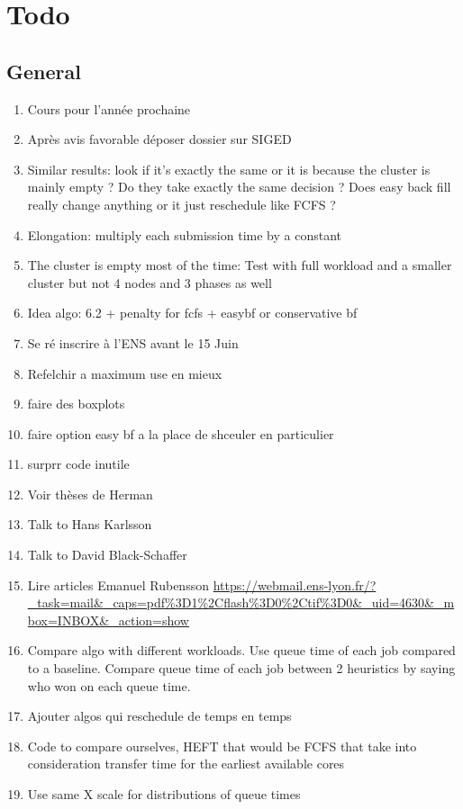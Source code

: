 \documentclass[a4paper]{article}
\begin{document}
\section{Todo}
	\subsection{General}
		\begin{enumerate}
			\item Cours pour l'année prochaine
			\item Après avis favorable déposer dossier sur SIGED
			\item Similar results: look if it's exactly the same or it is because the cluster is mainly empty ? Do they take exactly the same decision ? Does easy back fill really change anything or it just reschedule like FCFS ?
			\item Elongation: multiply each submission time by a constant
			\item The cluster is empty most of the time: Test with full workload and a smaller cluster but not 4 nodes and 3 phases as well
			\item Idea algo: 6.2 + penalty for fcfs + easybf or conservative bf
			\item Se ré inscrire à l'ENS avant le 15 Juin
			\item Refelchir a maximum use en mieux
			\item faire des boxplots
			\item faire option easy bf a la place de shceuler en particulier
			\item surprr code inutile
			\item Voir thèses de Herman
			\item Talk to Hans Karlsson
			\item Talk to David Black-Schaffer
			\item Lire articles Emanuel Rubensson \url{https://webmail.ens-lyon.fr/?_task=mail&_caps=pdf%3D1%2Cflash%3D0%2Ctif%3D0&_uid=4630&_mbox=INBOX&_action=show}
			\item Compare algo with different workloads. Use queue time of each job compared to a baseline. Compare queue time of each job between 2 heuristics by saying who won on each queue time.
			\item Ajouter algos qui reschedule de temps en temps
			\item Code to compare ourselves, HEFT that would be FCFS that take into consideration transfer time for the earliest available cores
			\item Use same X scale for distributions of queue times

\end{enumerate}
\end{document}
